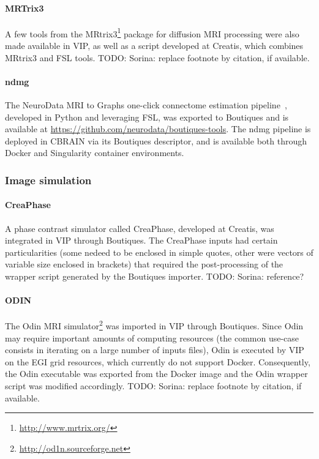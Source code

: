 \documentclass[a4paper,num-refs]{oup-contemporary}
\newcommand{\todo}[1]{\color{red}TODO: #1\color{black}}
\newcommand{\boutiques}{Boutiques\xspace}
\begin{document}
\paragraph{MRTrix3}
A few tools from the MRtrix3\footnote{\url{http://www.mrtrix.org/}}
package for diffusion MRI processing were also made available in VIP,
as well as a script developed at Creatis, which combines MRtrix3 and
FSL tools. \todo{Sorina: replace footnote by citation, if available.}

\paragraph{ndmg} The NeuroData MRI to Graphs one-click connectome estimation
pipeline~\cite{kiar2017comprehensive}, developed in Python and leveraging FSL, was
exported to \boutiques and is available at \url{https://github.com/neurodata/boutiques-tools}.
The ndmg pipeline is deployed in CBRAIN via its \boutiques descriptor, and is available
both through Docker and Singularity container environments.

\subsubsection{Image simulation}

\paragraph{CreaPhase}
A phase contrast simulator called CreaPhase, developed at Creatis, was
integrated in VIP through \boutiques. The CreaPhase inputs had
certain particularities (some nedeed to be enclosed in simple quotes,
other were vectors of variable size enclosed in brackets) that
required the post-processing of the wrapper script generated by the
Boutiques importer. \todo{Sorina: reference?}

\paragraph{ODIN} The Odin MRI simulator\footnote{\url{http://od1n.sourceforge.net}} was imported 
in VIP through \boutiques. Since Odin may require important amounts of
computing resources (the common use-case consists in iterating on a
large number of inputs files), Odin is executed by VIP on the EGI grid
resources, which currently do not support Docker. Consequently, the
Odin executable was exported from the Docker image and the Odin
wrapper script was modified accordingly. \todo{Sorina: replace footnote by citation, if available.}
\end{document}

